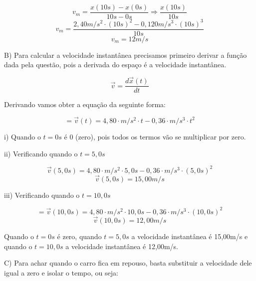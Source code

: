 \documentclass[a4paper, 12pt]{article}
\begin{document}
\begin{flushleft}
		\begin{equation*}
			v_m = \frac{x(10s) - x(0s)}{10s - 0s} \Rightarrow \frac{x(10s)}{10s}
		\end{equation*}
		\begin{equation*}
			v_m = \frac{2,40m/s^2 \cdot (10s)^2 - 0,120m/s^3 \cdot (10s)^3}{10s}
		\end{equation*}
		\begin{equation*}
			v_m = 12m/s
		\end{equation*}
		
		B) Para calcular a velocidade instantânea precisamos primeiro derivar a função dada pela questão, pois a derivada do espaço é a velocidade instantânea.
		
		\begin{equation*}
			\vec{v} = \dfrac{d\vec{x}(t)}{dt}
		\end{equation*}
		
		Derivando vamos obter a equação da seguinte forma:
		
		\begin{equation*}=
			\vec{v}(t) = 4,80 \cdot m/s^2 \cdot t - 0,36 \cdot m/s^3 \cdot t^2
		\end{equation*}
		
		i) Quando o $t=0s$ é 0 (zero), pois todos os termos vão se multiplicar por zero.
		
		ii) Verificando quando o $t=5,0s$
		
		\begin{equation*}
			\vec{v}(5,0s) = 4,80 \cdot m/s^2 \cdot 5,0s - 0,36 \cdot m/s^3 \cdot (5,0s)^2
		\end{equation*}
		\begin{equation*}
			\vec{v}(5,0s) = 15,00 m/s
		\end{equation*}
		
		iii) Verificando quando o $t=10,0s$
		
		\begin{equation*}=
			\vec{v}(10,0s) = 4,80 \cdot m/s^2 \cdot 10,0s - 0,36 \cdot m/s^3 \cdot (10,0s)^2
		\end{equation*}
		\begin{equation*}
			\vec{v}(10,0s) = 12,00 m/s
		\end{equation*}
		
		Quando o $t=0s$ é zero, quando $t=5,0s$ a velocidade instantânea é  15,00m/s e quando o $t=10,0s$ a velocidade instantânea é 12,00m/s.
		
		C) Para achar quando o carro fica em repouso, basta substituir a velocidade dele igual a zero e isolar o tempo, ou seja:
		

\end{flushleft}
\end{document}

